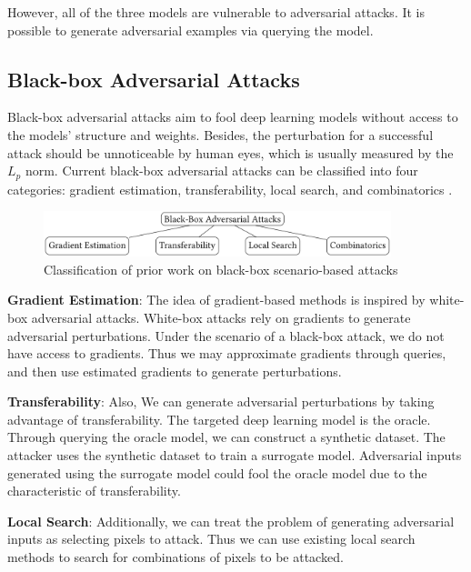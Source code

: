 However, all of the three models are vulnerable to adversarial attacks. It is possible to generate adversarial examples via querying the model.

\subsection{Black-box Adversarial Attacks}
\label{black_box}

Black-box adversarial attacks aim to fool deep learning models without access to the models' structure and weights. Besides, the perturbation for a successful attack should be unnoticeable by human eyes, which is usually measured by the $L_p$ norm. Current black-box adversarial attacks can be classified into four categories: gradient estimation, transferability, local search, and combinatorics \cite{bhambri2019survey}.

\begin{figure}[H]
\centering
\includegraphics[width=0.9\textwidth]{figures/chapter_classification/review.png}
\caption{Classification of prior work on black-box scenario-based attacks \cite{bhambri2019survey}}
\label{fig.bb_review}
\end{figure}

\textbf{Gradient Estimation}: The idea of gradient-based methods is inspired by white-box adversarial attacks. White-box attacks rely on gradients to generate adversarial perturbations. Under the scenario of a black-box attack, we do not have access to gradients. Thus we may approximate gradients through queries, and then use estimated gradients to generate perturbations. 

\textbf{Transferability}: Also, We can generate adversarial perturbations by taking advantage of transferability. The targeted deep learning model is the oracle. Through querying the oracle model, we can construct a synthetic dataset. The attacker uses the synthetic dataset to train a surrogate model. Adversarial inputs generated using the surrogate model could fool the oracle model due to the characteristic of transferability.

\textbf{Local Search}: Additionally, we can treat the problem of generating adversarial inputs as selecting pixels to attack. Thus we can use existing local search methods to search for combinations of pixels to be attacked.  

